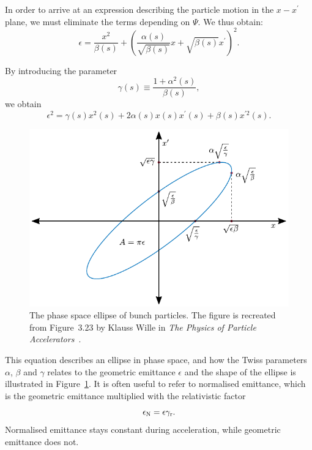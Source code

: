 In order to arrive at an expression describing the particle motion in the $x-x^\prime$ plane, we must eliminate the terms depending on $\Psi$.
We thus obtain:
\begin{equation}
    \epsilon = \frac{x^2}{\beta(s)} + \left(\frac{\alpha(s)}{\sqrt{\beta(s)}}x + \sqrt{\beta(s)}x^{\prime}\right)^2.
\end{equation}

By introducing the parameter
\begin{equation}
    \gamma(s) \equiv \frac{1+\alpha^2(s)}{\beta(s)}, \label{EQ:TwissGamma}
\end{equation}
we obtain
\begin{equation}
    \epsilon^2 = \gamma(s)x^2(s) + 2\alpha(s)x(s)x^{\prime}(s) + \beta(s)x^{\prime 2}(s). \label{EQ:EmittFull}
\end{equation}

\begin{figure}[hbt]
    \centering
    \includegraphics[width=0.8\linewidth]{figures/Twiss}
    \caption{\label{Fig:BPI:Twiss}
        The phase space ellipse of bunch particles.
        The figure is recreated from Figure~3.23 by Klauss Wille in \textit{The Physics of Particle Accelerators}~\cite{wille:2001}.
    }
\end{figure}

This equation describes an ellipse in phase space, and how the Twiss parameters $\alpha$, $\beta$ and $\gamma$ relates to the geometric emittance $\epsilon$ and the shape of the ellipse is illustrated in Figure~\ref{Fig:BPI:Twiss}.
It is often useful to refer to normalised emittance, which is the geometric emittance multiplied with the relativistic factor
\begin{equation}
    \epsilon_{\mathrm{N}} = \epsilon \gamma_{\mathrm{r}}. \label{EQ:NormEmit}
\end{equation}
Normalised emittance stays constant during acceleration, while geometric emittance does not.

